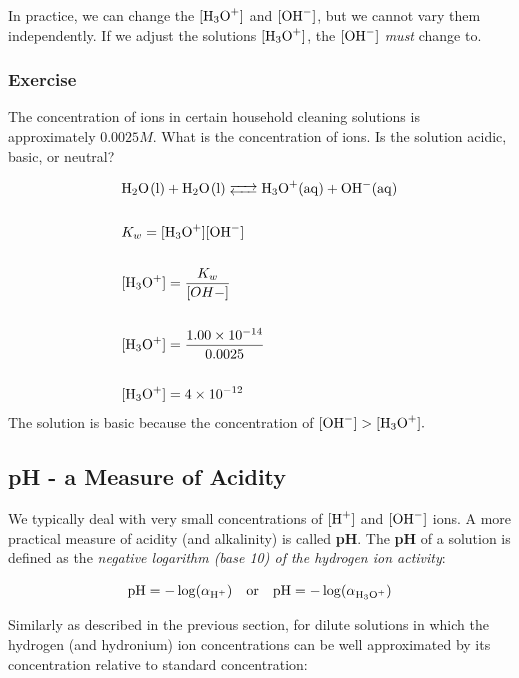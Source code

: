 \documentclass[12pt]{article}
\begin{document}
\noindent In practice, we can change the $[\ce{H3O+}]$ and $[\ce{OH-}]$, but we cannot vary them independently. If we adjust the solutions $[\ce{H3O+}]$, the $[\ce{OH-}]$ \textit{must} change to.

\subsubsection{Exercise}

The concentration of  ions in certain household cleaning solutions is approximately $0.0025 M$. What is the concentration of  ions. Is the solution acidic, basic, or neutral?

\begin{align*}
    &\ce{H2O(l) + H2O(l) <--> H3O+(aq) + OH-(aq)} \\
    \\
    &K_{w} = [\ce{H3O+}][\ce{OH-}]\\
    \\
    &[\ce{H3O+}] = \frac{K_{w}}{[OH-]} \\
    \\
    &[\ce{H3O+}] = \frac{1.00 \times 10^{-14}}{0.0025} \\
    \\
    &[\ce{H3O+}] = 4 \times 10^{-12} 
\end{align*}
\indent The solution is basic because the concentration of $[\ce{OH-}] > [\ce{H3O+}].$


\newpage

\subsection{pH - a Measure of Acidity}

We typically deal with very small concentrations of $[\ce{H+}]$ and $[\ce{OH-}]$ ions. A more practical measure of acidity (and alkalinity) is called \textbf{pH}. The \textbf{pH} of a solution is defined as the \textit{negative logarithm (base 10) of the hydrogen ion activity}:

\begin{equation}
\text{pH} = -\log(\alpha_{\ce{H+}}) \quad \text{or} \quad  \text{pH} = -\log(\alpha_{\ce{H3O+}})
\end{equation}

\noindent Similarly as described in the previous section, for dilute solutions in which the hydrogen (and hydronium) ion concentrations can be well approximated by its concentration relative to standard concentration:
\end{document}
